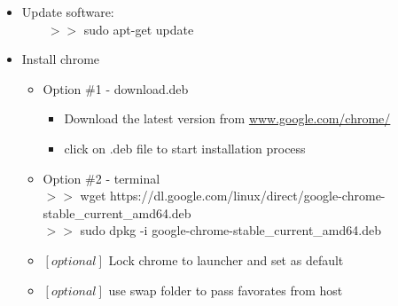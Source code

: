 \documentclass{scrartcl}
\begin{document}
\begin{itemize}
	\item Update software: \\ $\qquad >>$ sudo apt-get update
	\item Install chrome
	\begin{itemize}
		\item Option \#1 - download.deb
		\begin{itemize}
			\item Download the latest version from \href{https://www.google.com/chrome/}{www.google.com/chrome/}
			\item click on .deb file to start installation process
		\end{itemize}
		\item Option \#2 - terminal
			\\ $>>$ wget https://dl.google.com/linux/direct/google-chrome-stable\_current\_amd64.deb
			\\ $>>$ sudo dpkg -i google-chrome-stable\_current\_amd64.deb
		\item $[optional]$ Lock chrome to launcher and set as default
		\item $[optional]$ use swap folder to pass favorates from host
	\end{itemize}


\end{itemize}
\end{document}
